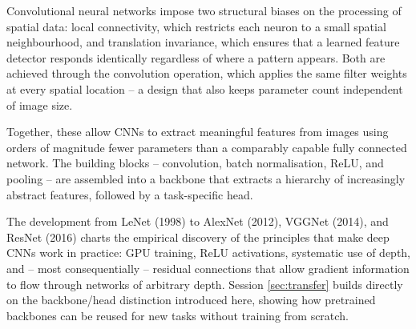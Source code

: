 Convolutional neural networks impose two structural biases on the processing of spatial data: local connectivity, which restricts each neuron to a small spatial neighbourhood, and translation invariance, which ensures that a learned feature detector responds identically regardless of where a pattern appears. Both are achieved through the convolution operation, which applies the same filter weights at every spatial location -- a design that also keeps parameter count independent of image size.

Together, these allow CNNs to extract meaningful features from images using orders of magnitude fewer parameters than a comparably capable fully connected network. The building blocks -- convolution, batch normalisation, ReLU, and pooling -- are assembled into a backbone that extracts a hierarchy of increasingly abstract features, followed by a task-specific head.

The development from LeNet (1998) to AlexNet (2012), VGGNet (2014), and ResNet (2016) charts the empirical discovery of the principles that make deep CNNs work in practice: GPU training, ReLU activations, systematic use of depth, and -- most consequentially -- residual connections that allow gradient information to flow through networks of arbitrary depth. Session \ref{sec:transfer} builds directly on the backbone/head distinction introduced here, showing how pretrained backbones can be reused for new tasks without training from scratch.
